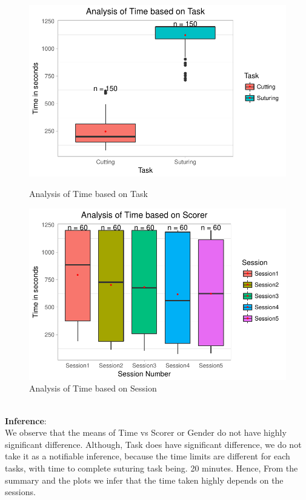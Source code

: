 \documentclass[12pt,epsf]{report}
\begin{document}
\begin{figure}[!htb]
	\begin{minipage}[c]{0.5\linewidth}
	\includegraphics[width=\linewidth]{TaskVsTime.pdf}
	\caption{Analysis of Time based on Task}
	\end{minipage}
	\hfill
	\begin{minipage}[c]{0.5\linewidth}
	\includegraphics[width=\linewidth]{SessionVsTime.pdf}
	\caption{Analysis of Time based on Session}
	\end{minipage}
\end{figure}\\
\textbf{Inference}:\\
We observe that the means of Time vs Scorer or Gender do not have highly significant difference. Although, Task does have significant difference, we do not take it as a notifiable inference, because the time limits are different for each tasks, with time to complete suturing task being. 20 minutes. Hence, From the summary and the plots we infer that the time taken highly depends on the sessions.\\
\\
\FloatBarrier
\end{document}
